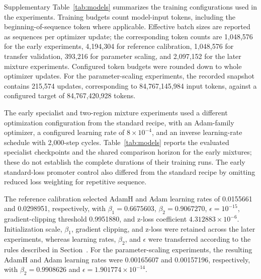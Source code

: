 \documentclass[a4paper,num-refs]{oup-contemporary}
\begin{document}
Supplementary Table~\ref{tab:models} summarizes the training
configurations used in the experiments.
Training budgets count model-input tokens, including the
beginning-of-sequence token where applicable.
Effective batch sizes are reported as sequences per optimizer update;
the corresponding token counts are 1,048,576 for the early experiments,
4,194,304 for reference calibration, 1,048,576 for transfer validation,
393,216 for parameter scaling, and 2,097,152 for the later mixture
experiments.
Configured token budgets were rounded down to whole optimizer updates.
For the parameter-scaling experiments, the recorded snapshot contains
215,574 updates, corresponding to 84,767,145,984 input tokens, against
a configured target of 84,767,420,928 tokens.

The early specialist and two-region mixture experiments used a
different optimization configuration from the standard recipe,
with an Adam-family optimizer, a configured learning rate of
$8\times10^{-4}$, and an inverse learning-rate schedule with
2,000-step cycles.
Table~\ref{tab:models} reports the evaluated specialist checkpoints and
the shared comparison horizon for the early mixtures; these do not
establish the complete durations of their training runs.
The early standard-loss promoter control also differed from the
standard recipe by omitting reduced loss weighting for repetitive
sequence.

The reference calibration selected AdamH and Adam learning rates of
0.0155661 and 0.0298951, respectively, with
$\beta_1=0.6675603$, $\beta_2=0.9067270$,
$\epsilon=10^{-15}$, gradient-clipping threshold 0.9951880,
and z-loss coefficient $4.312883\times10^{-6}$.
Initialization scale, $\beta_1$, gradient clipping, and z-loss
were retained across the later experiments, whereas learning rates,
$\beta_2$, and $\epsilon$ were transferred according to the rules
described in Section~.
For the parameter-scaling experiments, the resulting AdamH and Adam
learning rates were 0.00165607 and 0.00157196, respectively, with
$\beta_2=0.9908626$ and
$\epsilon=1.901774\times10^{-14}$.
\end{document}
